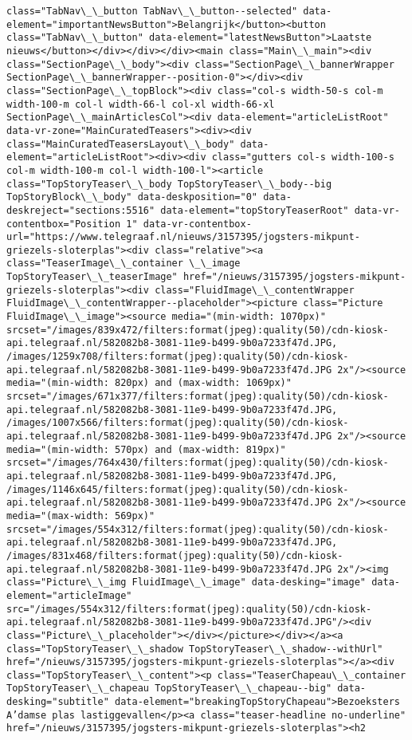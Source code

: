 \documentclass[11pt]{article}
\begin{document}
\begin{Verbatim}[commandchars=\\\{\}]
class="TabNav\_\_button TabNav\_\_button--selected" data-element="importantNewsButton">Belangrijk</button><button class="TabNav\_\_button" data-element="latestNewsButton">Laatste nieuws</button></div></div></div><main class="Main\_\_main"><div class="SectionPage\_\_body"><div class="SectionPage\_\_bannerWrapper SectionPage\_\_bannerWrapper--position-0"></div><div class="SectionPage\_\_topBlock"><div class="col-s width-50-s col-m width-100-m col-l width-66-l col-xl width-66-xl SectionPage\_\_mainArticlesCol"><div data-element="articleListRoot" data-vr-zone="MainCuratedTeasers"><div><div class="MainCuratedTeasersLayout\_\_body" data-element="articleListRoot"><div><div class="gutters col-s width-100-s col-m width-100-m col-l width-100-l"><article class="TopStoryTeaser\_\_body TopStoryTeaser\_\_body--big TopStoryBlock\_\_body" data-deskposition="0" data-deskreject="sections:5516" data-element="topStoryTeaserRoot" data-vr-contentbox="Position 1" data-vr-contentbox-url="https://www.telegraaf.nl/nieuws/3157395/jogsters-mikpunt-griezels-sloterplas"><div class="relative"><a class="TeaserImage\_\_container \_\_image TopStoryTeaser\_\_teaserImage" href="/nieuws/3157395/jogsters-mikpunt-griezels-sloterplas"><div class="FluidImage\_\_contentWrapper FluidImage\_\_contentWrapper--placeholder"><picture class="Picture FluidImage\_\_image"><source media="(min-width: 1070px)" srcset="/images/839x472/filters:format(jpeg):quality(50)/cdn-kiosk-api.telegraaf.nl/582082b8-3081-11e9-b499-9b0a7233f47d.JPG, /images/1259x708/filters:format(jpeg):quality(50)/cdn-kiosk-api.telegraaf.nl/582082b8-3081-11e9-b499-9b0a7233f47d.JPG 2x"/><source media="(min-width: 820px) and (max-width: 1069px)" srcset="/images/671x377/filters:format(jpeg):quality(50)/cdn-kiosk-api.telegraaf.nl/582082b8-3081-11e9-b499-9b0a7233f47d.JPG, /images/1007x566/filters:format(jpeg):quality(50)/cdn-kiosk-api.telegraaf.nl/582082b8-3081-11e9-b499-9b0a7233f47d.JPG 2x"/><source media="(min-width: 570px) and (max-width: 819px)" srcset="/images/764x430/filters:format(jpeg):quality(50)/cdn-kiosk-api.telegraaf.nl/582082b8-3081-11e9-b499-9b0a7233f47d.JPG, /images/1146x645/filters:format(jpeg):quality(50)/cdn-kiosk-api.telegraaf.nl/582082b8-3081-11e9-b499-9b0a7233f47d.JPG 2x"/><source media="(max-width: 569px)" srcset="/images/554x312/filters:format(jpeg):quality(50)/cdn-kiosk-api.telegraaf.nl/582082b8-3081-11e9-b499-9b0a7233f47d.JPG, /images/831x468/filters:format(jpeg):quality(50)/cdn-kiosk-api.telegraaf.nl/582082b8-3081-11e9-b499-9b0a7233f47d.JPG 2x"/><img class="Picture\_\_img FluidImage\_\_image" data-desking="image" data-element="articleImage" src="/images/554x312/filters:format(jpeg):quality(50)/cdn-kiosk-api.telegraaf.nl/582082b8-3081-11e9-b499-9b0a7233f47d.JPG"/><div class="Picture\_\_placeholder"></div></picture></div></a><a class="TopStoryTeaser\_\_shadow TopStoryTeaser\_\_shadow--withUrl" href="/nieuws/3157395/jogsters-mikpunt-griezels-sloterplas"></a><div class="TopStoryTeaser\_\_content"><p class="TeaserChapeau\_\_container TopStoryTeaser\_\_chapeau TopStoryTeaser\_\_chapeau--big" data-desking="subtitle" data-element="breakingTopStoryChapeau">Bezoeksters A’damse plas lastiggevallen</p><a class="teaser-headline no-underline" href="/nieuws/3157395/jogsters-mikpunt-griezels-sloterplas"><h2 
\end{Verbatim}
\end{document}
